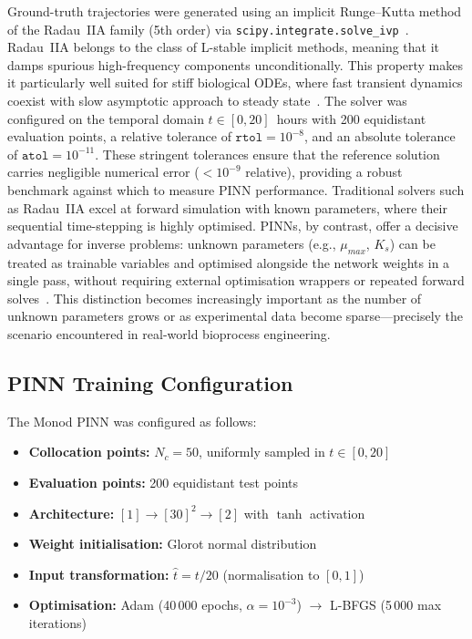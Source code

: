 \documentclass[14pt,a4paper,openany]{extbook}
\begin{document}
Ground-truth trajectories were generated using an implicit Runge--Kutta method of the Radau~IIA family (5th order) via \texttt{scipy.integrate.solve\_ivp}~\cite{virtanen2020scipy}. Radau~IIA belongs to the class of L-stable implicit methods, meaning that it damps spurious high-frequency components unconditionally. This property makes it particularly well suited for stiff biological ODEs, where fast transient dynamics coexist with slow asymptotic approach to steady state~\cite{hairer1996solving}. The solver was configured on the temporal domain $t \in [0, 20]$~hours with 200 equidistant evaluation points, a relative tolerance of $\texttt{rtol} = 10^{-8}$, and an absolute tolerance of $\texttt{atol} = 10^{-11}$. These stringent tolerances ensure that the reference solution carries negligible numerical error ($< 10^{-9}$ relative), providing a robust benchmark against which to measure PINN performance. Traditional solvers such as Radau~IIA excel at forward simulation with known parameters, where their sequential time-stepping is highly optimised. PINNs, by contrast, offer a decisive advantage for inverse problems: unknown parameters (e.g., $\mu_{max}$, $K_s$) can be treated as trainable variables and optimised alongside the network weights in a single pass, without requiring external optimisation wrappers or repeated forward solves~\cite{lu2021deepxde}. This distinction becomes increasingly important as the number of unknown parameters grows or as experimental data become sparse---precisely the scenario encountered in real-world bioprocess engineering.


\subsection{PINN Training Configuration}
\label{subsec:monod_training}

The Monod PINN was configured as follows:

\begin{itemize}
    \item \textbf{Collocation points:} $N_c = 50$, uniformly sampled in $t \in [0, 20]$
    \item \textbf{Evaluation points:} 200 equidistant test points
    \item \textbf{Architecture:} $[1] \to [30]^2 \to [2]$ with $\tanh$ activation
    \item \textbf{Weight initialisation:} Glorot normal distribution
    \item \textbf{Input transformation:} $\hat{t} = t/20$ (normalisation to $[0,1]$)
    \item \textbf{Optimisation:} Adam (40\,000 epochs, $\alpha = 10^{-3}$) $\to$ L-BFGS (5\,000 max iterations)
\end{itemize}
\end{document}
